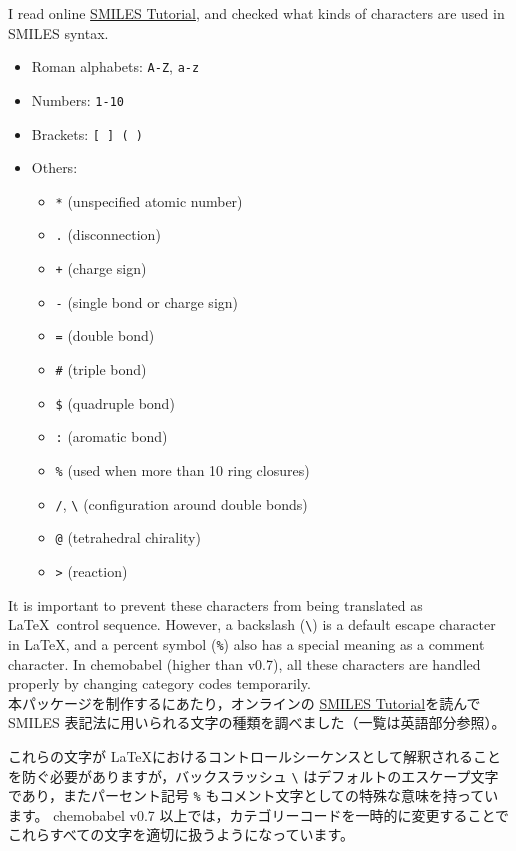 \documentclass[12pt]{jsarticle}
\begin{document}
I read online \href{http://www.daylight.com/meetings/summerschool98/course/dave/smiles-intro.html}{SMILES Tutorial}, and checked what kinds of characters are used in SMILES syntax.
\begin{itemize}
\item Roman alphabets: \verb|A-Z|, \verb|a-z|
\item Numbers: \verb|1-10|
\item Brackets: \verb|[ ] ( )|
\item Others:
\begin{itemize}
\item \verb|*| (unspecified atomic number)
\item \verb|.| (disconnection)
\item \verb|+| (charge sign)
\item \verb|-| (single bond or charge sign)
\item \verb|=| (double bond)
\item \verb|#| (triple bond)
\item \verb|$| (quadruple bond)
\item \verb|:| (aromatic bond)
\item \verb|%| (used when more than 10 ring closures)
\item \verb|/|, \verb|\| (configuration around double bonds)
\item \verb|@| (tetrahedral chirality)
\item \verb|>| (reaction)
\end{itemize}
\end{itemize}

It is important to prevent these characters from being translated as \LaTeX\ control sequence.
However, a backslash (\verb|\|) is a default escape character in \LaTeX, and a percent symbol (\verb|%|) also has a special meaning as a comment character.
In \textsf{chemobabel} (higher than v0.7), all these characters are handled properly by changing category codes temporarily. \\

本パッケージを制作するにあたり，オンラインの \href{http://www.daylight.com/meetings/summerschool98/course/dave/smiles-intro.html}{SMILES Tutorial}を読んで SMILES 表記法に用いられる文字の種類を調べました（一覧は英語部分参照）。

これらの文字が \LaTeX におけるコントロールシーケンスとして解釈されることを防ぐ必要がありますが，バックスラッシュ \verb|\| はデフォルトのエスケープ文字であり，またパーセント記号 \verb|%| もコメント文字としての特殊な意味を持っています。
\textsf{chemobabel} v0.7 以上では，カテゴリーコードを一時的に変更することでこれらすべての文字を適切に扱うようになっています。
\end{document}
